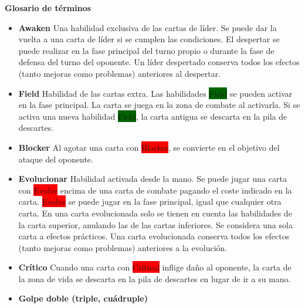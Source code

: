 \documentclass[10pt,a4paper]{article}
\begin{document}
\begin{shaded}
  \textbf{Glosario de términos}
  \begin{itemize}
    \item \textbf{Awaken} \newline
    Una habilidad exclusiva de las cartas de líder. \newline
    Se puede dar la vuelta a una carta de líder si se cumplen las condiciones.
    El despertar se puede realizar en la fase principal del turno propio o durante la fase de defensa del turno del oponente. \newline
    Un líder despertado conserva todos los efectos (tanto mejoras como problemas) anteriores al despertar.
    \item \textbf{Field} \newline
    Habilidad de las cartas extra.
    Las habilidades \colorbox{darkgreen}{\color{white}Field} se pueden activar en la fase principal. La carta se juega en la zona de combate al activarla.
    Si se activa una nueva habilidad \colorbox{darkgreen}{\color{white}Field}, la carta antigua se descarta en la pila de descartes.
    \item \textbf{Blocker} \newline
    Al agotar una carta con \colorbox{red}{\color{white}Blocker}, se convierte en el objetivo del ataque del oponente.
    \item \textbf{Evolucionar} \newline
    Habilidad activada desde la mano. \newline
    Se puede jugar una carta con \colorbox{red}{\color{white}Evolve} encima de una carta de combate pagando el coste indicado en la carta.
    \colorbox{red}{\color{white}Evolve} se puede jugar en la fase principal, igual que cualquier otra carta. \newline
    En una carta evolucionada solo se tienen en cuenta las habilidades de la carta superior, anulando las de las cartas inferiores. Se considera una sola carta a efectos prácticos. \newline
    Una carta evolucionada conserva todos los efectos (tanto mejoras como problemas) anteriores a la evolución.
    \item \textbf{Crítico} \newline
    Cuando una carta con \colorbox{red}{\color{white}Critical} inflige daño al oponente, la carta de la zona de vida se descarta en la pila de descartes en lugar de ir a su mano.
    \item \textbf{Golpe doble (triple, cuádruple)} \newline

\end{itemize}
\end{shaded}
\end{document}
